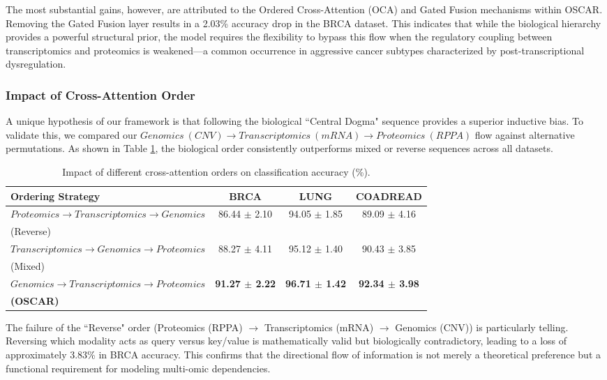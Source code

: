 \documentclass[lettersize,journal]{IEEEtran}
\begin{document}
The most substantial gains, however, are attributed to the Ordered Cross-Attention (OCA) and Gated Fusion mechanisms within OSCAR. Removing the Gated Fusion layer results in a 2.03\% accuracy drop in the BRCA dataset. This indicates that while the biological hierarchy provides a powerful structural prior, the model requires the flexibility to bypass this flow when the regulatory coupling between transcriptomics and proteomics is weakened—a common occurrence in aggressive cancer subtypes characterized by post-transcriptional dysregulation.

\subsubsection{Impact of Cross-Attention Order}
A unique hypothesis of our framework is that following the biological ``Central Dogma" sequence provides a superior inductive bias. To validate this, we compared our $Genomics\ (CNV) \rightarrow Transcriptomics\ (mRNA) \rightarrow Proteomics\ (RPPA)$ flow against alternative permutations. As shown in Table \ref{tab:ablation_order}, the biological order consistently outperforms mixed or reverse sequences across all datasets.

\begin{table}[!htbp]
\centering
\small
\caption{Impact of different cross-attention orders on classification accuracy (\%).}
\label{tab:ablation_order}
\begin{tabular}{lccc}
\hline

\textbf{Ordering Strategy} & \textbf{BRCA} & \textbf{LUNG} & \textbf{COADREAD} \\ \hline
$Proteomics \rightarrow Transcriptomics \rightarrow Genomics$ & 86.44 $\pm$ 2.10 & 94.05 $\pm$ 1.85 & 89.09 $\pm$ 4.16 \\
(Reverse) \\
$Transcriptomics \rightarrow Genomics \rightarrow Proteomics $ & 88.27 $\pm$ 4.11 & 95.12 $\pm$ 1.40 & 90.43 $\pm$ 3.85 \\
(Mixed) \\
\textbf{$ Genomics \rightarrow Transcriptomics \rightarrow Proteomics $} & \textbf{91.27 $\pm$ 2.22} & \textbf{96.71 $\pm$ 1.42} & \textbf{92.34 $\pm$ 3.98} \\ 
\textbf{(OSCAR)}\\ 

\hline
\end{tabular}
\end{table}


The failure of the ``Reverse" order (Proteomics (RPPA) $\rightarrow$ Transcriptomics (mRNA) $\rightarrow$ Genomics (CNV)) is particularly telling. Reversing which modality acts as query versus key/value is mathematically valid but biologically contradictory, leading to a loss of approximately 3.83\% in BRCA accuracy. This confirms that the directional flow of information is not merely a theoretical preference but a functional requirement for modeling multi-omic dependencies.
\end{document}
